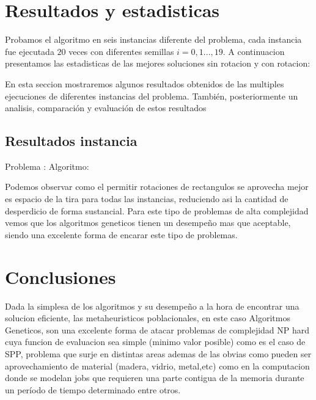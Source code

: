 \documentclass[10pt]{article}
\begin{document}
\section{Resultados y estadisticas} %
 
Probamos el algoritmo en seis instancias diferente del problema, cada instancia fue ejecutada $20$ veces con diferentes semillas $i=0,1...,19$. A continuacion presentamos las estadisticas de las mejores soluciones sin rotacion y con rotacion:

\label{sec:Estadisticas}%

En esta seccion mostraremos algunos resultados obtenidos de las multiples ejecuciones de diferentes instancias del problema.%
También, posteriormente un analisis, comparación y evaluación de estos resultados%
\subsection{Resultados instancia}%

\label{subsec:}%

Problema :  \newline%
%
 Algoritmo: %


Podemos observar como el permitir rotaciones de rectangulos se aprovecha mejor es espacio de la tira para todas las instancias, reduciendo asi la cantidad de desperdicio de forma sustancial. Para este tipo de problemas de alta complejidad vemos que los algoritmos geneticos tienen un desempeño mas que aceptable, siendo una excelente forma de encarar este tipo de problemas.


\section{Conclusiones}
Dada la simplesa de los algoritmos y su desempeño a la hora de encontrar una solucion eficiente, las metaheuristicos poblacionales, en este caso Algoritmos Geneticos, son una excelente forma de atacar problemas de complejidad NP hard cuya funcion de evaluacion sea simple (minimo valor posible) como es el caso de SPP, problema que surje en distintas areas ademas de las obvias como pueden ser aprovechamiento de material (madera, vidrio, metal,etc) como en la computacion donde se modelan jobs que requieren una parte contigua de la memoria durante un período de tiempo determinado entre otros.
\end{document}
